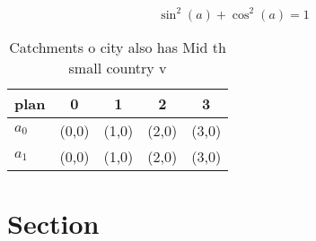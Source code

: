 \documentclass[a4paper]{article}
\begin{document}
\[ \sin^2(a)+\cos^2(a) = 1 \]

\begin{table}
\begin{adjustbox}{width=0.6\columnwidth}
\begin{tabular}{|l|l|l|l|l|}
\hline
\textbf{plan} & \multicolumn{1}{c|}{\textbf{0}} & \multicolumn{1}{c|}{\textbf{1}} & \multicolumn{1}{c|}{\textbf{2}} & \multicolumn{1}{c|}{\textbf{3}} \\ \hline
\textbf{$a_0$}  & (0,0) & (1,0) & (2,0) & (3,0) \\ \hline
\textbf{$a_1$}  & (0,0) & (1,0) & (2,0) & (3,0) \\ \hline
\end{tabular}
\end{adjustbox}
\caption{Catchments o city also has Mid th small country v
}
\end{table}

\section{Section}
\end{document}
